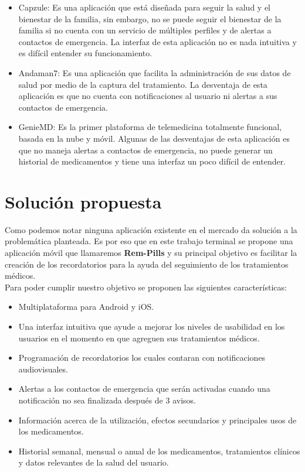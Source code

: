 \begin{itemize}
	\item Capzule: Es una aplicación que está diseñada para seguir la salud y el bienestar de la familia, sin embargo, no se puede seguir el bienestar de la familia si no cuenta con un servicio de múltiples perfiles y de alertas a contactos de emergencia. La interfaz de esta aplicación no es nada intuitiva y es difícil entender su funcionamiento.

	\item Andaman7: Es una aplicación que facilita la administración de sus datos de salud por medio de la captura del tratamiento. La desventaja de esta aplicación es que no cuenta con notificaciones al usuario ni alertas a sus contactos de emergencia. 
	
	\item GenieMD: Es la primer plataforma de telemedicina totalmente funcional, basada en la nube y móvil. Algunas de las desventajas de esta aplicación es que no maneja alertas a contactos de emergencia, no puede generar un historial de medicamentos y tiene una interfaz un poco difícil de entender.
	
\end{itemize}

	
\section{Solución propuesta}
Como podemos notar ninguna aplicación existente en el mercado da solución a la problemática planteada.
Es por eso que en este trabajo terminal se propone una aplicación móvil que llamaremos \textbf{Rem-Pills} y su principal objetivo es facilitar la creación de los recordatorios para la ayuda del seguimiento de los tratamientos médicos.\\
Para poder cumplir nuestro objetivo se proponen las siguientes características:
\begin{itemize}
	\item Multiplataforma para Android y iOS.
	
	\item Una interfaz intuitiva que ayude a mejorar los niveles de usabilidad en los usuarios en el momento en que agreguen sus tratamientos médicos.
	
	\item Programación de recordatorios los cuales contaran con notificaciones audiovisuales.
	
	\item Alertas a los contactos de emergencia que serán activadas cuando una notificación no sea finalizada después de 3 avisos.
	
	\item Información acerca de la utilización, efectos secundarios y principales usos de los medicamentos.
	
	\item Historial semanal, mensual o anual de los medicamentos, tratamientos clínicos y datos relevantes de la salud del usuario.
	
\end{itemize}




